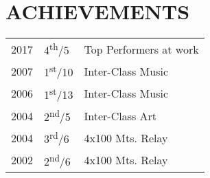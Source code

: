 \documentclass[]{deedy-resume-openfont}
\begin{document}
\begin{minipage}[t]{0.33\textwidth}

\section{ACHIEVEMENTS}
\begin{tabular}{rll}
2017 &  4\textsuperscript{th}/5 & Top Performers at work\\
2007 & 1\textsuperscript{st}/10 & Inter-Class Music\\
2006 & 1\textsuperscript{st}/13 & Inter-Class Music\\
2004 & 2\textsuperscript{nd}/5 & Inter-Class Art\\
2004 & 3\textsuperscript{rd}/6 & 4x100 Mts. Relay\\
2002 & 2\textsuperscript{nd}/6 & 4x100 Mts. Relay
\end{tabular}
\sectionsep






%

\end{minipage}
\hfill
\end{document}
